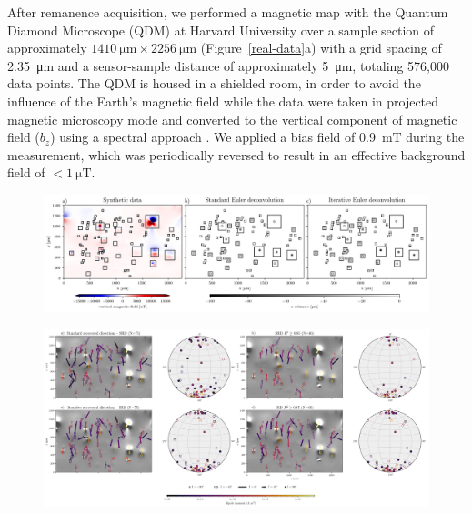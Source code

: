 After remanence acquisition, we performed a magnetic map with the Quantum
Diamond Microscope (QDM) at Harvard University over a sample section of
approximately $\qty{1410}{\um} \times \qty{2256}{\um}$ (Figure~\ref{real-data}a) with a grid spacing of \qty{2.35}{\um} and a sensor-sample distance of approximately \qty{5}{\um}, totaling 576,000 data points. The QDM is housed in a shielded room, in order to avoid the influence of the Earth's magnetic field while the data were taken in projected magnetic microscopy mode and converted to the vertical component of magnetic field ($b_z$) using a spectral approach \citep{Lima2009, Fu2020, Glenn2017}. We applied a bias field of \qty{0.9}{\milli\tesla} during the measurement, which was periodically reversed to result in an effective background field of $< \qty{1}{\micro\tesla}$.

\begin{figure}[tb!]
  \centering
  \includegraphics[width=1\linewidth]{paper/figures/euler-comparion-real.png}
  \caption{
      }
  \label{real-data-euler}
\end{figure}

\begin{figure}[tb!]
  \centering
  \includegraphics[width=1\linewidth]{paper/figures/real-data-stereograms.png}
  \caption{
      }
  \label{real-data-stereograms}
\end{figure}

